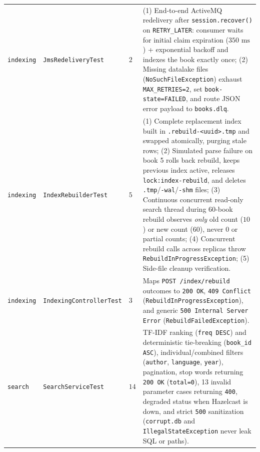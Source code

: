 \documentclass[10pt,a4paper]{article}
\begin{document}
\begin{table}[!htbp]
\begin{tabularx}{\textwidth}{L{1.4cm} L{3.6cm} C{0.8cm} Y}
\texttt{indexing} & \texttt{JmsRedeliveryTest} & $2$ & (1) End-to-end ActiveMQ redelivery after \texttt{session.recover()} on \texttt{RETRY\_LATER}: consumer waits for initial claim expiration ($350\text{ ms}$) + exponential backoff and indexes the book exactly once; (2) Missing datalake files (\texttt{NoSuchFileException}) exhaust \texttt{MAX\_RETRIES=2}, set \texttt{book-state=FAILED}, and route JSON error payload to \texttt{books.dlq}. \\
\texttt{indexing} & \texttt{IndexRebuilderTest} & $5$ & (1) Complete replacement index built in \texttt{.rebuild-<uuid>.tmp} and swapped atomically, purging stale rows; (2) Simulated parse failure on book 5 rolls back rebuild, keeps previous index active, releases \texttt{lock:index-rebuild}, and deletes \texttt{.tmp}/\texttt{-wal}/\texttt{-shm} files; (3) Continuous concurrent read-only search thread during 60-book rebuild observes \emph{only} old count ($10$) or new count ($60$), never $0$ or partial counts; (4) Concurrent rebuild calls across replicas throw \texttt{RebuildInProgressException}; (5) Side-file cleanup verification. \\
\texttt{indexing} & \texttt{IndexingControllerTest} & $3$ & Maps \texttt{POST /index/rebuild} outcomes to \texttt{200 OK}, \texttt{409 Conflict} (\texttt{RebuildInProgressException}), and generic \texttt{500 Internal Server Error} (\texttt{RebuildFailedException}). \\
\texttt{search} & \texttt{SearchServiceTest} & $14$ & TF-IDF ranking (\texttt{freq DESC}) and deterministic tie-breaking (\texttt{book\_id ASC}), individual/combined filters (\texttt{author}, \texttt{language}, \texttt{year}), pagination, stop words returning \texttt{200 OK} (\texttt{total=0}), 13 invalid parameter cases returning \texttt{400}, degraded status when Hazelcast is down, and strict \texttt{500} sanitization (\texttt{corrupt.db} and \texttt{IllegalStateException} never leak SQL or paths). \\
\bottomrule
\end{tabularx}
\end{table}
\end{document}
